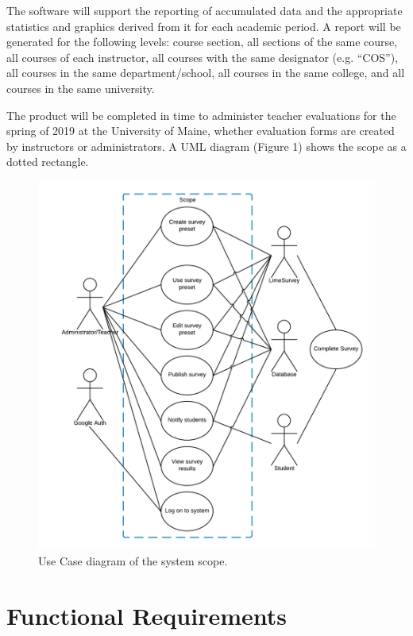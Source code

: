 \documentclass{article}
\begin{document}
The software will support the reporting of accumulated data and the appropriate statistics and graphics derived from it for each academic period. A report will be generated for the following levels: course section, all sections of the same course, all courses of each instructor, all courses with the same designator (e.g. ``COS''), all courses in the same department/school, all courses in the same college, and all courses in the same university.

The product will be completed in time to administer teacher evaluations for the spring of 2019 at the University of Maine, whether evaluation forms are created by instructors or administrators. A UML diagram (Figure 1) shows the scope as a dotted rectangle.\par

\begin{center}
\begin{figure}
    \centering
    \includegraphics[scale=.75]{Scope.png}
    \caption{Use Case diagram of the system scope.}
    \label{fig:my_label}
\end{figure}
\end{center}

\newpage

\section{Functional Requirements}
\end{document}
